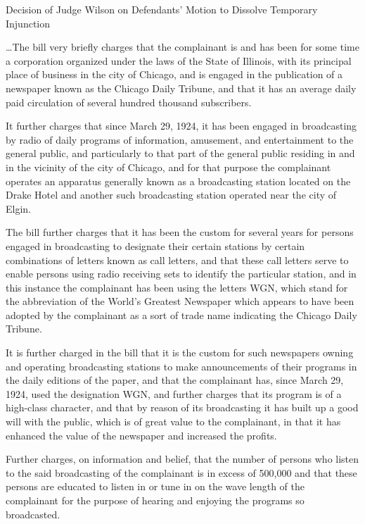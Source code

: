 

\opinion Decision of Judge Wilson on Defendants' Motion to Dissolve
Temporary Injunction

\ldots The bill very briefly charges that the complainant is and has been for
some time a corporation organized under the laws of the State of Illinois, with
its principal place of business in the city of Chicago, and is engaged in the
publication of a newspaper known as the Chicago Daily Tribune, and that it has
an average daily paid circulation of several hundred thousand subscribers.

It further charges that since March 29, 1924, it has been engaged in
broadcasting by radio of daily programs of information, amusement, and
entertainment to the general public, and particularly to that part of the
general public residing in and in the vicinity of the city of Chicago, and for
that purpose the complainant operates an apparatus generally
known as a broadcasting station located on the Drake Hotel and another such
broadcasting station operated near the city of Elgin.

The bill further charges that it has been the custom for several years for
persons engaged in broadcasting to designate their certain stations by certain
combinations of letters known as call letters, and that these call letters
serve to enable persons using radio receiving sets to identify the particular
station, and in this instance the complainant has been using the letters WGN,
which stand for the abbreviation of the World's Greatest Newspaper which
appears to have been adopted by the complainant as a sort of trade name
indicating the Chicago Daily Tribune.

It is further charged in the bill that it is the custom for such newspapers
owning and operating broadcasting stations to make announcements of their
programs in the daily editions of the paper, and that the complainant has,
since March 29, 1924, used the designation WGN, and further charges that its
program is of a high-class character, and that by reason of its broadcasting it
has built up a good will with the public, which is of great value to the
complainant, in that it has enhanced the value of the newspaper and increased
the profits.

Further charges, on information and belief, that the number of persons who
listen to the said broadcasting of the complainant is in excess of 500,000 and
that these persons are educated to listen in or tune in on the wave
length of the complainant for the purpose of hearing and
enjoying the programs so broadcasted.

